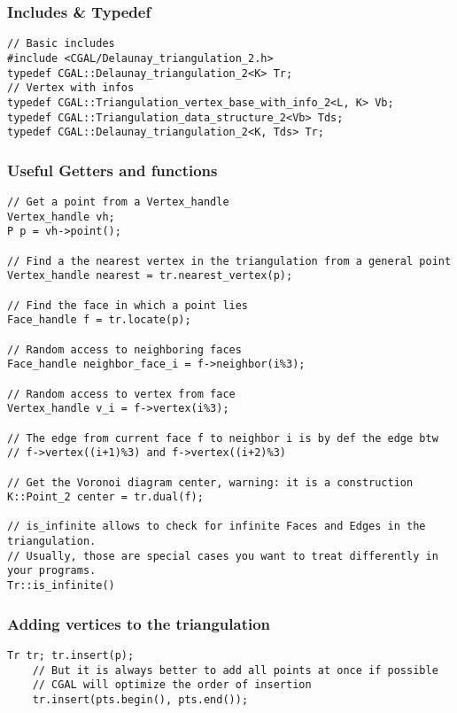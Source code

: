 \documentclass{article}
\begin{document}
\subsubsection{Includes \& Typedef}
\begin{lstlisting}[frame=single]
// Basic includes
#include <CGAL/Delaunay_triangulation_2.h>
typedef CGAL::Delaunay_triangulation_2<K> Tr;
// Vertex with infos
typedef CGAL::Triangulation_vertex_base_with_info_2<L, K> Vb;
typedef CGAL::Triangulation_data_structure_2<Vb> Tds;
typedef CGAL::Delaunay_triangulation_2<K, Tds> Tr;
\end{lstlisting}

\subsubsection{Useful Getters and functions}
\begin{lstlisting}[frame=single]
// Get a point from a Vertex_handle
Vertex_handle vh;
P p = vh->point();

// Find a the nearest vertex in the triangulation from a general point
Vertex_handle nearest = tr.nearest_vertex(p);

// Find the face in which a point lies
Face_handle f = tr.locate(p);

// Random access to neighboring faces
Face_handle neighbor_face_i = f->neighbor(i%3);

// Random access to vertex from face
Vertex_handle v_i = f->vertex(i%3);

// The edge from current face f to neighbor i is by def the edge btw 
// f->vertex((i+1)%3) and f->vertex((i+2)%3)

// Get the Voronoi diagram center, warning: it is a construction
K::Point_2 center = tr.dual(f);

// is_infinite allows to check for infinite Faces and Edges in the triangulation.
// Usually, those are special cases you want to treat differently in your programs.
Tr::is_infinite()

\end{lstlisting}
    
\subsubsection{Adding vertices to the triangulation}
\begin{lstlisting}[frame=single]
    Tr tr; tr.insert(p);
    // But it is always better to add all points at once if possible
    // CGAL will optimize the order of insertion
    tr.insert(pts.begin(), pts.end());
\end{lstlisting}
\end{document}
